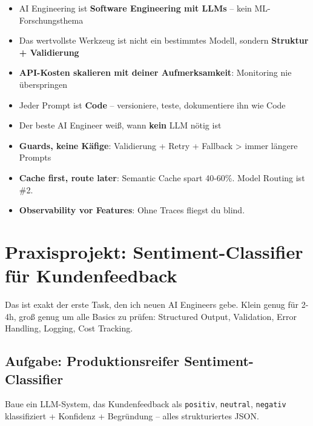 \par\mbox{}\par
\begin{merkeEnv}
\begin{itemize}
    \item AI Engineering ist \textbf{Software Engineering mit LLMs} -- kein ML-Forschungsthema
    \item Das wertvollste Werkzeug ist nicht ein bestimmtes Modell, sondern \textbf{Struktur + Validierung}
    \item \textbf{API-Kosten skalieren mit deiner Aufmerksamkeit}: Monitoring nie überspringen
    \item Jeder Prompt ist \textbf{Code} -- versioniere, teste, dokumentiere ihn wie Code
    \item Der beste AI Engineer weiß, wann \textbf{kein} LLM nötig ist
    \item \textbf{Guards, keine Käfige}: Validierung + Retry + Fallback > immer längere Prompts
    \item \textbf{Cache first, route later}: Semantic Cache spart 40-60\%. Model Routing ist \#2.
    \item \textbf{Observability vor Features}: Ohne Traces fliegst du blind.
\end{itemize}
\end{merkeEnv}

\section{Praxisprojekt: Sentiment-Classifier für Kundenfeedback}




\par\mbox{}\par
\begin{AUTORnotizEnv}
Das ist exakt der erste Task, den ich neuen AI Engineers gebe.
Klein genug für 2-4h, groß genug um alle Basics zu prüfen:
Structured Output, Validation, Error Handling, Logging, Cost Tracking.
\end{AUTORnotizEnv}

\subsection{Aufgabe: Produktionsreifer Sentiment-Classifier}

Baue ein LLM-System, das Kundenfeedback als \texttt{positiv}, \texttt{neutral}, \texttt{negativ} klassifiziert + Konfidenz + Begründung -- alles strukturiertes JSON.

